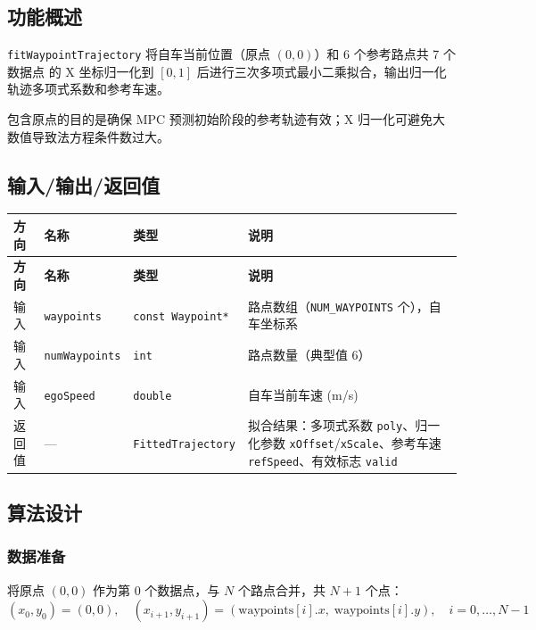 \documentclass[a4paper,10pt]{article}
\begin{document}
\subsection{功能概述}

\texttt{fitWaypointTrajectory} 将自车当前位置（原点 $(0,0)$）和 6 个参考路点共 7 个数据点
的 X 坐标归一化到 $[0,1]$ 后进行三次多项式最小二乘拟合，输出归一化轨迹多项式系数和参考车速。

包含原点的目的是确保 MPC 预测初始阶段的参考轨迹有效；X 归一化可避免大数值导致法方程条件数过大。

\subsection{输入/输出/返回值}

\renewcommand{\arraystretch}{1.3}
\begin{longtable}{|C{1.5cm}|L{3.5cm}|C{2.5cm}|L{7.5cm}|}
\hline
\textbf{方向} & \textbf{名称} & \textbf{类型} & \textbf{说明} \\
\hline
\endfirsthead
\hline
\textbf{方向} & \textbf{名称} & \textbf{类型} & \textbf{说明} \\
\hline
\endhead
输入 & \texttt{waypoints} & \texttt{const Waypoint*} & 路点数组（\texttt{NUM\_WAYPOINTS} 个），自车坐标系 \\
\hline
输入 & \texttt{numWaypoints} & \texttt{int} & 路点数量（典型值 6） \\
\hline
输入 & \texttt{egoSpeed} & \texttt{double} & 自车当前车速 (m/s) \\
\hline
返回值 & --- & \texttt{FittedTrajectory} & 拟合结果：多项式系数 \texttt{poly}、归一化参数 \texttt{xOffset}/\texttt{xScale}、参考车速 \texttt{refSpeed}、有效标志 \texttt{valid} \\
\hline
\end{longtable}

\subsection{算法设计}

\subsubsection{数据准备}

将原点 $(0,0)$ 作为第 0 个数据点，与 $N$ 个路点合并，共 $N{+}1$ 个点：
\begin{equation}
  (x_0, y_0) = (0, 0), \quad (x_{i+1}, y_{i+1}) = (\text{waypoints}[i].x,\; \text{waypoints}[i].y), \quad i = 0,\ldots,N{-}1
\end{equation}
\end{document}
